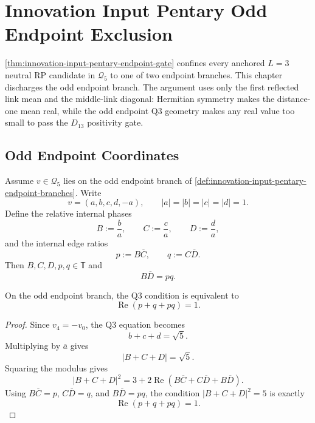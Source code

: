 \chapter{Innovation Input Pentary Odd Endpoint Exclusion}
\label{ch:visions-innovation-input-pentary-odd-endpoint-exclusion}

\autoref{thm:innovation-input-pentary-endpoint-gate} confines every
anchored $L=3$ neutral RP candidate in $\mathcal Q_5$ to one of two
endpoint branches. This chapter discharges the odd endpoint branch. The
argument uses only the first reflected link mean and the middle-link
diagonal: Hermitian symmetry makes the distance-one mean real, while the
odd endpoint Q3 geometry makes any real value too small to pass the
$D_{13}$ positivity gate.

\section{Odd Endpoint Coordinates}
\label{sec:innovation-input-odd-endpoint-coordinates}

\begin{definition}
\label{def:innovation-input-odd-endpoint-relative-coordinates}
Assume $v\in\mathcal Q_5$ lies on the odd endpoint branch of
\autoref{def:innovation-input-pentary-endpoint-branches}. Write
$$
v=(a,b,c,d,-a),
\qquad
|a|=|b|=|c|=|d|=1.
$$
Define the relative internal phases
$$
B:=\frac ba,
\qquad
C:=\frac ca,
\qquad
D:=\frac da,
$$
and the internal edge ratios
$$
p:=B\overline C,
\qquad
q:=C\overline D.
$$
Then $B,C,D,p,q\in\mathbb T$ and
$$
B\overline D=pq.
$$
\end{definition}

\begin{theorem}
\label{thm:innovation-input-odd-endpoint-qthree-edge-equation}
On the odd endpoint branch, the Q3 condition is equivalent to
$$
\operatorname{Re}(p+q+pq)=1.
$$
\end{theorem}

\begin{proof}
Since $v_4=-v_0$, the Q3 equation becomes
$$
b+c+d=\sqrt5.
$$
Multiplying by $\overline a$ gives
$$
|B+C+D|=\sqrt5.
$$
Squaring the modulus gives
$$
|B+C+D|^2
=
3+2\operatorname{Re}
\left(
B\overline C+C\overline D+B\overline D
\right).
$$
Using $B\overline C=p$, $C\overline D=q$, and $B\overline D=pq$, the
condition $|B+C+D|^2=5$ is exactly
$$
\operatorname{Re}(p+q+pq)=1.
$$
\end{proof}

